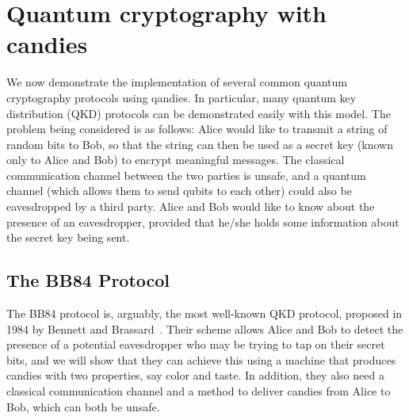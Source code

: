 \documentclass{article}
\begin{document}
\section{Quantum cryptography with candies}\label{QKD section}
We now demonstrate the implementation of several common quantum cryptography protocols using qandies.
In particular, many quantum key distribution (QKD) protocols can be demonstrated easily with this model.
The problem being considered is as follows: Alice would like to transmit a string of random bits to Bob, so that the string can then be used as a secret key (known only to Alice and Bob) to encrypt meaningful messages.
The classical communication channel between the two parties is unsafe, and a quantum channel (which allows them to send qubits to each other) could also be eavesdropped by a third party.
Alice and Bob would like to know about the presence of an eavesdropper, provided that he/she holds some information about the secret key being sent. 

\subsection{The BB84 Protocol}

The BB84 protocol is, arguably, the most well-known QKD protocol, proposed in 1984 by Bennett and Brassard~\cite{bennett1984quantum}.
Their scheme allows Alice and Bob to detect the presence of a potential eavesdropper who may be trying to tap on their secret bits, and we will show that they can achieve this using a machine that produces candies with two properties, say color and taste.
In addition, they also need a classical communication channel and a method to deliver candies from Alice to Bob, which can both be unsafe.
\end{document}
